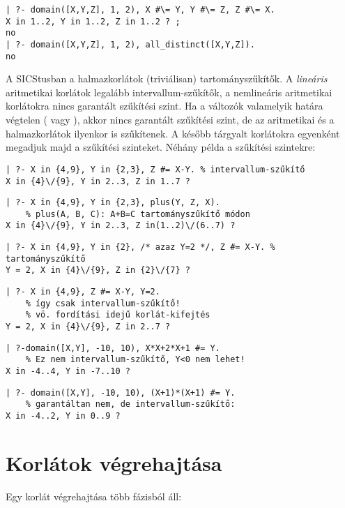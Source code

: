 \begin{verbatim}
| ?- domain([X,Y,Z], 1, 2), X #\= Y, Y #\= Z, Z #\= X.
X in 1..2, Y in 1..2, Z in 1..2 ? ;
no
| ?- domain([X,Y,Z], 1, 2), all_distinct([X,Y,Z]).
no
\end{verbatim}

A SICStusban a halmazkorlátok (triviálisan) tartományszűkítők. A
\emph{lineáris} aritmetikai korlátok legalább intervallum-szűkítők,
a nemlineáris aritmetikai korlátokra nincs garantált szűkítési szint.
Ha a változók valamelyik határa végtelen ( vagy ), akkor
nincs garantált szűkítési szint, de az aritmetikai és a halmazkorlátok
ilyenkor is szűkítenek. A később tárgyalt korlátokra egyenként megadjuk majd
a szűkítési szinteket.
\br
Néhány példa a szűkítési szintekre:
\begin{verbatim}
| ?- X in {4,9}, Y in {2,3}, Z #= X-Y. % intervallum-szűkítő
X in {4}\/{9}, Y in 2..3, Z in 1..7 ? 
\end{verbatim}
\begin{verbatim}
| ?- X in {4,9}, Y in {2,3}, plus(Y, Z, X).
    % plus(A, B, C): A+B=C tartományszűkítő módon
X in {4}\/{9}, Y in 2..3, Z in(1..2)\/(6..7) ? 
\end{verbatim}
\begin{verbatim}
| ?- X in {4,9}, Y in {2}, /* azaz Y=2 */, Z #= X-Y. % tartományszűkítő
Y = 2, X in {4}\/{9}, Z in {2}\/{7} ? 
\end{verbatim}
\begin{verbatim}
| ?- X in {4,9}, Z #= X-Y, Y=2.
    % így csak intervallum-szűkítő!
    % vö. fordítási idejű korlát-kifejtés
Y = 2, X in {4}\/{9}, Z in 2..7 ? 
\end{verbatim}
\begin{verbatim}
| ?-domain([X,Y], -10, 10), X*X+2*X+1 #= Y.
    % Ez nem intervallum-szűkítő, Y<0 nem lehet!
X in -4..4, Y in -7..10 ? 
\end{verbatim}
\begin{verbatim}
| ?- domain([X,Y], -10, 10), (X+1)*(X+1) #= Y.
    % garantáltan nem, de intervallum-szűkítő:
X in -4..2, Y in 0..9 ?   
\end{verbatim}



\section{Korlátok végrehajtása}

\label{korlatvegrehajtas}

Egy korlát végrehajtása több fázisból áll:

